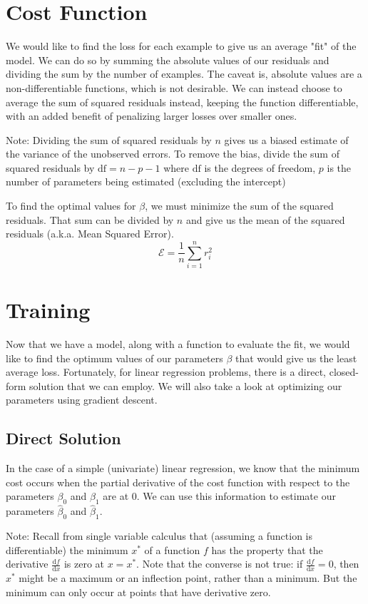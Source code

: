 \documentclass{article}
\begin{document}
\section{Cost Function}
We would like to find the loss for each example to give us an average "fit" of the model. We can do so by summing the absolute values of our residuals and dividing the sum by the number of examples. The caveat is, absolute values are a non-differentiable functions, which is not desirable. We can instead choose to average the sum of squared residuals instead, keeping the function differentiable, with an added benefit of penalizing larger losses over smaller ones.

Note: Dividing the sum of squared residuals by \(n\) gives us a biased estimate of the variance of the unobserved errors. To remove the bias, divide the sum of squared residuals by \(\mathrm{df} = n - p - 1\) where \(\mathrm{df}\) is the degrees of freedom, \(p\) is the number of parameters being estimated (excluding the intercept)

To find the optimal values for \(\beta\), we must minimize the sum of the squared residuals. That sum can be divided by \(n\) and give us the mean of the squared residuals (a.k.a. Mean Squared Error).
\[
	\boxed{\mathcal{E} = \frac{1}{n}\sum_{i=1}^nr_i^2}
\]

\section{Training}
Now that we have a model, along with a function to evaluate the fit, we would like to find the optimum values of our parameters \(\beta\) that would give us the least average loss. Fortunately, for linear regression problems, there is a direct, closed-form solution that we can employ. We will also take a look at optimizing our parameters using gradient descent.

\subsection{Direct Solution}
In the case of a simple (univariate) linear regression, we know that the minimum cost occurs when the partial derivative of the cost function with respect to the parameters \(\beta_0\) and \(\beta_1\) are at 0. We can use this information to estimate our parameters \(\hat\beta_0\) and \(\hat\beta_1\).

Note: Recall from single variable calculus that (assuming a function is differentiable) the minimum \(x^*\) of a function \(f\) has the property that the derivative \(\frac{\mathrm{d}f}{\mathrm{d}x}\) is zero at \(x = x^*\). Note that the converse is not true: if \(\frac{\mathrm{d}f}{\mathrm{d}x} = 0\), then \(x^*\) might be a maximum or an inflection point, rather than a minimum. But the minimum can only occur at points that have derivative zero.
\end{document}
